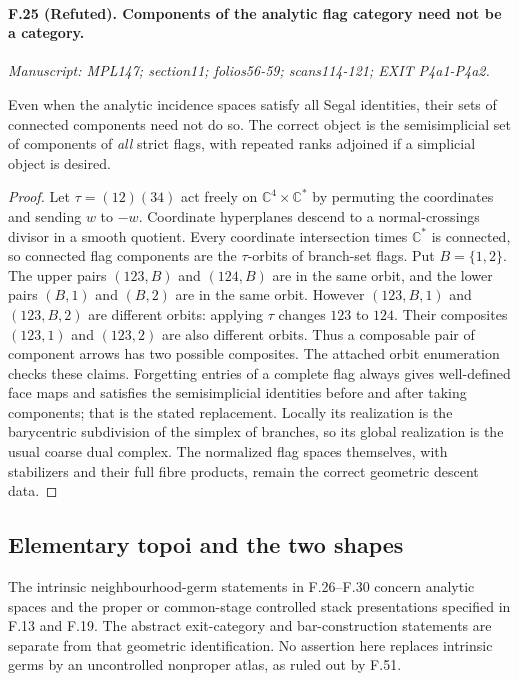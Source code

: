 \paragraph{F.25 (Refuted). Components of the analytic flag category
need not be a category.}
\textit{Manuscript: MPL147; section11; folios56-59; scans114-121; EXIT P4a1-P4a2.}

Even when the analytic incidence spaces satisfy all Segal identities,
their sets of connected components need not do so. The correct object
is the semisimplicial set of components of \emph{all} strict flags,
with repeated ranks adjoined if a simplicial object is desired.

\begin{proof}
Let $\tau=(12)(34)$ act freely on $\mathbb C^4\times\mathbb C^*$
by permuting the coordinates and sending $w$ to $-w$. Coordinate
hyperplanes descend to a normal-crossings divisor in a smooth
quotient. Every coordinate intersection times $\mathbb C^*$ is
connected, so connected flag components are the $\tau$-orbits of
branch-set flags. Put $B=\{1,2\}$. The upper pairs $(123,B)$ and
$(124,B)$ are in the same orbit, and the lower pairs $(B,1)$ and
$(B,2)$ are in the same orbit. However $(123,B,1)$ and $(123,B,2)$
are different orbits: applying $\tau$ changes $123$ to $124$.
Their composites $(123,1)$ and $(123,2)$ are also different orbits.
Thus a composable pair of component arrows has two possible
composites. The attached orbit enumeration checks these claims.
Forgetting entries of a complete flag always gives well-defined
face maps and satisfies the semisimplicial identities before and
after taking components; that is the stated replacement. Locally
its realization is the barycentric subdivision of the simplex of
branches, so its global realization is the usual coarse dual complex.
The normalized flag spaces themselves, with stabilizers and their
full fibre products, remain the correct geometric descent data.
\end{proof}

\subsection{Elementary topoi and the two shapes}

The intrinsic neighbourhood-germ statements in F.26--F.30 concern
analytic spaces and the proper or common-stage controlled stack
presentations specified in F.13 and F.19. The abstract exit-category
and bar-construction statements are separate from that geometric
identification. No assertion here replaces intrinsic germs by an
uncontrolled nonproper atlas, as ruled out by F.51.

